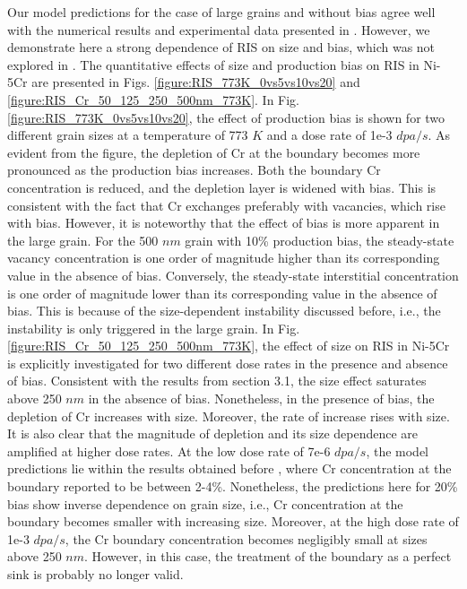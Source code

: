 \documentclass[utf8]{frontiersSCNS} %
\begin{document}
Our model predictions for the case of large grains and without bias agree well with the numerical results and experimental data presented in \citep{barr_grain_2015}. However, we demonstrate here a strong dependence of RIS on size and bias, which was not explored in \citep{barr_grain_2015}. The quantitative effects of size and production bias on RIS in Ni-5Cr are presented in Figs. \ref{figure:RIS_773K_0vs5vs10vs20} and \ref{figure:RIS_Cr_50_125_250_500nm_773K}. In Fig. \ref{figure:RIS_773K_0vs5vs10vs20}, the effect of production bias is shown for two different grain sizes at a temperature of 773 $K$ and a dose rate of 1e-3 $dpa/s$. As evident from the figure, the depletion of Cr at the boundary becomes more pronounced as the production bias increases. Both the boundary Cr concentration is reduced, and the depletion layer is widened with bias. This is consistent with the fact that Cr exchanges preferably with vacancies, which rise with bias. However, it is noteworthy that the effect of bias is more apparent in the large grain. For the 500 $nm$ grain with 10\% production bias, the steady-state vacancy concentration is one order of magnitude higher than its corresponding value in the absence of bias. Conversely, the steady-state interstitial concentration is one order of magnitude lower than its corresponding value in the absence of bias. This is because of the size-dependent instability discussed before, i.e., the instability is only triggered in the large grain. In Fig. \ref{figure:RIS_Cr_50_125_250_500nm_773K}, the effect of size on RIS in Ni-5Cr is explicitly investigated for two different dose rates in the presence and absence of bias. Consistent with the results from section 3.1, the size effect saturates above 250 $nm$ in the absence of bias. Nonetheless, in the presence of bias, the depletion of Cr increases with size. Moreover, the rate of increase rises with size. It is also clear that the magnitude of depletion and its size dependence are amplified at higher dose rates. At the low dose rate of 7e-6 $dpa/s$, the model predictions lie within the results obtained before \citep{barr_grain_2015}, where Cr concentration at the boundary reported to be between 2-4\%. Nonetheless, the predictions here for 20\% bias show inverse dependence on grain size, i.e., Cr concentration at the boundary becomes smaller with increasing size. Moreover, at the high dose rate of 1e-3 $dpa/s$, the Cr boundary concentration becomes negligibly small at sizes above 250 $nm$. However, in this case, the treatment of the boundary as a perfect sink is probably no longer valid. 
\end{document}
